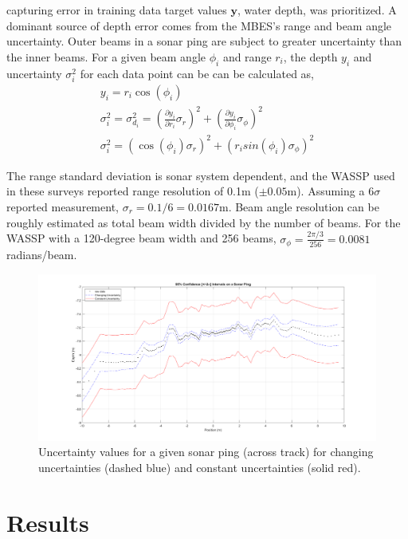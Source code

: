 capturing error in training data target values $\boldsymbol{y}$, water depth, was prioritized. A dominant source of depth error comes from the MBES's range and beam angle uncertainty. Outer beams in a sonar ping are subject to greater uncertainty than the inner beams. For a given beam angle $\phi_i$ and range $r_i$, the depth $y_i$ and uncertainty $\sigma_i^2$ for each data point can be can be calculated as,
\begin{gather*}
    y_i = r_i \cos(\phi_i) \\
    \sigma_i^2 = \sigma_{d_i}^2 = \left( \frac{\partial y_i}{\partial r_i} \sigma_r \right)^2 + \left( \frac{\partial y_i}{\partial \phi_i} \sigma_{\phi} \right)^2 \\
    \sigma_i^2 = \left( \cos(\phi_i) \sigma_r \right)^2 + \left( r_i sin(\phi_i) \sigma_{\phi} \right)^2 
\end{gather*}

The range standard deviation is sonar system dependent, and the WASSP used in these surveys reported range resolution of 0.1m ($\pm 0.05$m). Assuming a $6\sigma$ reported measurement, $\sigma_{r} = 0.1 / 6 = 0.0167$m. Beam angle resolution can be roughly estimated as total beam width divided by the number of beams. For the WASSP with a 120-degree beam width and 256 beams, $\sigma_\phi = \frac{2\pi/3}{256} = 0.0081$ radians/beam.
\begin{figure}[!ht]
    \begin{center}
       \includegraphics[width=1\textwidth]{images/ChangingvsConstantUncertaintiesPing.png}
    \end{center}
    \caption{Uncertainty values for a given sonar ping (across track) for changing uncertainties (dashed blue) and constant uncertainties (solid red).} \label{fig:uncertainty_ping}
\end{figure}
  
\section{Results}\label{sec:results}


